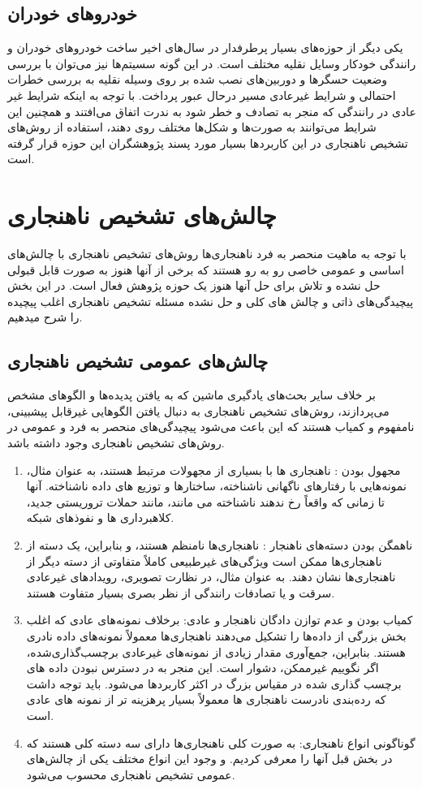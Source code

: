 \documentclass[12pt,a4paper]{report}
\theoremstyle{definition}
\theoremstyle{definition}
\begin{document}
\subsection{خودرو‌های خودران}
یکی دیگر از حوزه‌های بسیار پرطرفدار در سال‌های اخیر ساخت خودرو‌های خودران و رانندگی خودکار وسایل نقلیه مختلف است. در این گونه سسیتم‌ها نیز می‌توان با بررسی وضعیت حسگر‌ها و دوربین‌های نصب شده بر روی وسیله نقلیه به بررسی خطرات احتمالی و شرایط غیرعادی مسیر درحال عبور پرداخت. با توجه به اینکه شرایط غیر عادی در رانندگی که منجر به تصادف و خطر شود به ندرت اتفاق می‌افتند و همچنین این شرایط می‌توانند به صورت‌ها و شکل‌ها مختلف روی دهند، استفاده از روش‌های تشخیص ناهنجاری در این کاربردها بسیار مورد پسند پژوهشگران این حوزه قرار گرفته است.

\section{چالش‌‌های تشخیص ناهنجاری}
با توجه به ماهیت منحصر به فرد ناهنجاری‌ها روش‌های تشخیص ناهنجاری با چالش‌های اساسی و عمومی خاصی رو به رو هستند که برخی از آنها هنوز به صورت قابل قبولی حل نشده و تلاش برای حل آنها هنوز یک حوزه پژوهش فعال است. در این بخش پیچیدگی‌های ذاتی و چالش های کلی و حل نشده مسئله تشخیص ناهنجاری اغلب پیچیده را شرح میدهیم. 
\subsection{چالش‌های عمومی تشخیص ناهنجاری}
بر خلاف سایر بحث‌های یادگیری ماشین که به یافتن پدیده‌ها و الگوهای مشخص می‌پردازند، روش‌های تشخیص ناهنجاری به دنبال یافتن الگوهایی غیرقابل پیشبینی، نامفهوم و کمیاب هستند که این باعث می‌شود پیچیدگی‌های منحصر به فرد و عمومی در روش‌های تشخیص ناهنجاری وجود داشته باشد.
\begin{enumerate}
\item{مجهول بودن
:‌
ناهنجاری ها با بسیاری از مجهولات مرتبط هستند، به عنوان مثال، نمونه‌هایی با رفتارهای ناگهانی ناشناخته، ساختارها و توزیع های داده ناشناخته. آنها تا زمانی که واقعاً رخ ندهند ناشناخته می مانند، مانند حملات تروریستی جدید، کلاهبرداری ها و نفوذهای شبکه.
}
\item
{
ناهمگن بودن دسته‌های ناهنجار 
:
ناهنجاری‌ها نامنظم هستند، و بنابراین، یک دسته از ناهنجاری‌ها ممکن است ویژگی‌های غیرطبیعی کاملاً متفاوتی از دسته دیگر از ناهنجاری‌ها نشان دهند. به عنوان مثال، در نظارت تصویری، رویدادهای غیرعادی سرقت و یا تصادفات رانندگی از نظر بصری بسیار متفاوت هستند.
}

\item{
کمیاب بودن و عدم توازن دادگان ناهنجار و عادی:
برخلاف نمونه‌های عادی که اغلب بخش بزرگی از داده‌ها را تشکیل می‌دهند ناهنجاری‌ها معمولاً نمونه‌های داده نادری هستند. بنابراین، جمع‌آوری مقدار زیادی از نمونه‌های غیرعادی برچسب‌گذاری‌شده، اگر نگوییم غیرممکن، دشوار است. این منجر به در دسترس نبودن داده های برچسب گذاری شده در مقیاس بزرگ در اکثر کاربرد‌ها می‌شود. باید توجه داشت که  رده‌بندی نادرست ناهنجاری ها معمولاً بسیار پرهزینه تر از نمونه های عادی است.
}

\item{
گوناگونی انواع ناهنجاری:
به صورت کلی ناهنجاری‌ها دارای سه دسته کلی هستند که در بخش قبل آنها را معرفی کردیم. و وجود این انواع مختلف یکی از چالش‌های عمومی تشخیص ناهنجاری محسوب می‌شود.
}
\end{enumerate}
\end{document}
